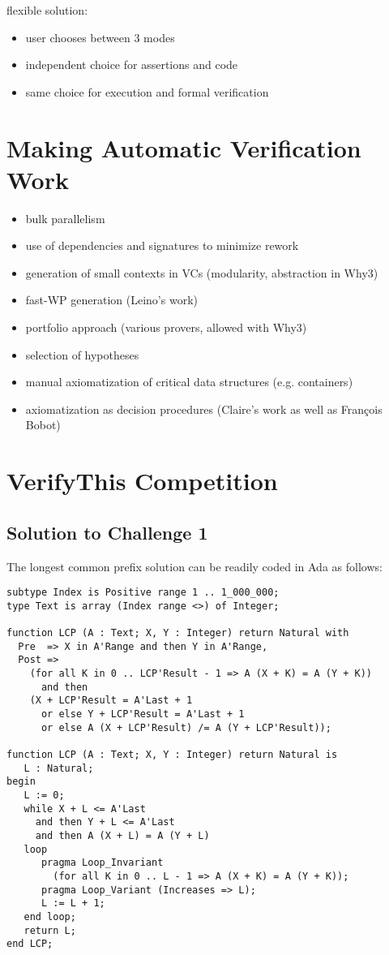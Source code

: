 \documentclass[sttt,draft]{svjour}
\begin{document}
flexible solution:
\begin{itemize}
\item user chooses between 3 modes
\item independent choice for assertions and code
\item same choice for execution and formal verification
\end{itemize}

\section{Making Automatic Verification Work}
\label{automation}

\begin{itemize}
\item bulk parallelism
\item use of dependencies and signatures to minimize rework
\item generation of small contexts in VCs (modularity, abstraction in Why3)
\item fast-WP generation (Leino's work)
\item portfolio approach (various provers, allowed with Why3)
\item selection of hypotheses
\item manual axiomatization of critical data structures (e.g. containers)
\item axiomatization as decision procedures (Claire's work as well as François
  Bobot)
\end{itemize}

\section{VerifyThis Competition}
\label{verifythis}

\subsection{Solution to Challenge 1}

The longest common prefix solution can be readily coded in Ada as follows:

\begin{footnotesize}
\begin{verbatim}
subtype Index is Positive range 1 .. 1_000_000;
type Text is array (Index range <>) of Integer;

function LCP (A : Text; X, Y : Integer) return Natural with
  Pre  => X in A'Range and then Y in A'Range,
  Post =>
    (for all K in 0 .. LCP'Result - 1 => A (X + K) = A (Y + K))
      and then
    (X + LCP'Result = A'Last + 1
      or else Y + LCP'Result = A'Last + 1
      or else A (X + LCP'Result) /= A (Y + LCP'Result));

function LCP (A : Text; X, Y : Integer) return Natural is
   L : Natural;
begin
   L := 0;
   while X + L <= A'Last
     and then Y + L <= A'Last
     and then A (X + L) = A (Y + L)
   loop
      pragma Loop_Invariant
        (for all K in 0 .. L - 1 => A (X + K) = A (Y + K));
      pragma Loop_Variant (Increases => L);
      L := L + 1;
   end loop;
   return L;
end LCP;
\end{verbatim}
\end{footnotesize}
\end{document}
